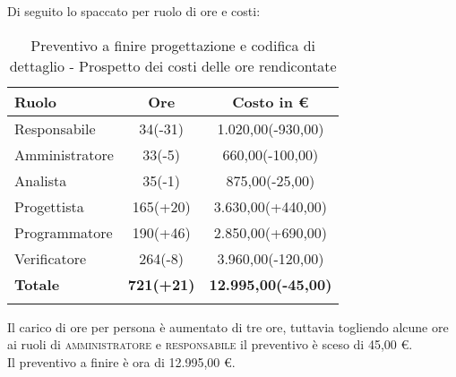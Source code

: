 \documentclass[../piano_di_progetto.tex]{subfiles}
\begin{document}
Di seguito lo spaccato per ruolo di ore e costi:
\begin{center}
	\begin{longtable}{|l|c|c|}
		\hline
		\rowcolor{lightgray}
		\textbf{Ruolo} & \textbf{Ore} & \textbf{Costo in €}\\
		\hline
		
		Responsabile & 34(-31) & 1.020,00(-930,00) \\
		Amministratore & 33(-5) & 660,00(-100,00) \\
		Analista & 35(-1) & 875,00(-25,00) \\
		Progettista & 165(+20) & 3.630,00(+440,00) \\
		Programmatore & 190(+46) & 2.850,00(+690,00) \\
		Verificatore & 264(-8) & 3.960,00(-120,00) \\
		\hline
		\textbf{Totale} & \textbf{721(+21)} & \textbf{12.995,00(-45,00)}\\
		\hline
		\rowcolor{white}
		\caption{Preventivo a finire progettazione e codifica di dettaglio - Prospetto dei costi delle ore rendicontate}
	\end{longtable}
\end{center}
Il carico di ore per persona è aumentato di tre ore, tuttavia togliendo alcune ore ai ruoli di \textsc{amministratore} e \textsc{responsabile} il preventivo è sceso di 45,00 €.\\
Il preventivo a finire è ora di 12.995,00 €. 
\end{document}
